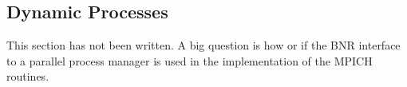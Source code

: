 \documentclass{article}
\begin{document}
\subsubsection{}


\subsection{Dynamic Processes}

This section has not been written.  A big question is how or if the BNR
interface to a parallel process manager is used in the implementation
of the MPICH routines.  

\subsubsection{}
\subsubsection{}
\subsubsection{}
\subsubsection{}
\subsubsection{}
\subsubsection{}
\subsubsection{}
\subsubsection{}
\subsubsection{}
\subsubsection{}
\end{document}

